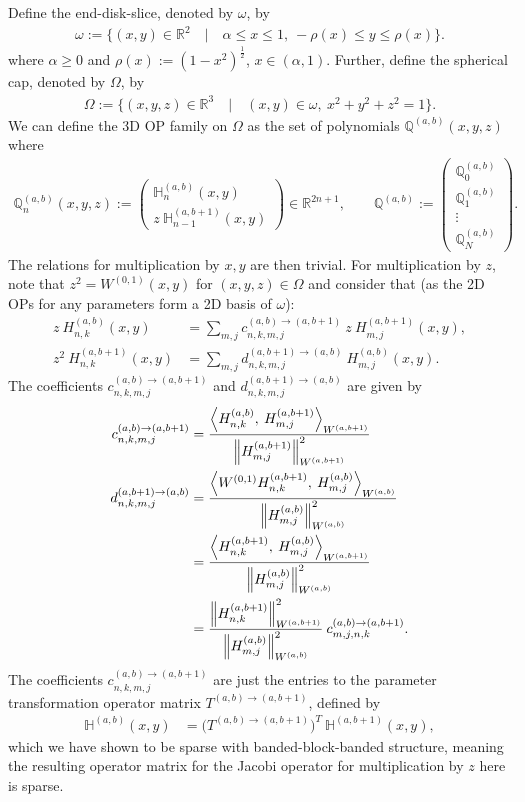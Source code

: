 \documentclass[11pt, oneside]{article}   	%
\newcommand{\half}{\frac{1}{2}}
\newcommand{\R}{\mathbb{R}}
\newcommand{\hdop}{H}
\newcommand{\bighdop}{\mathbb{\hdop}}
\newcommand{\hdopnk}{\hdop_{n,k}}
\newcommand{\hdopnkab}{\hdop_{n,k}^{(a,b)}}
\newcommand{\Wab}{{W^{(a,b)}}}
\newcommand{\hdopmjab}{\hdop_{m,j}^{(a,b)}}
\newcommand{\bighdopab}{\bighdop^{(a,b)}}
\newcommand{\bigQ}{\mathbb{Q}}
\newcommand{\bigQab}{\bigQ^{(a,b)}}
\begin{document}
Define the end-disk-slice, denoted by $\omega$, by
\begin{align}
	\omega := \{(x,y) \in \R^2 \quad | \quad \alpha \le x \le 1, \: - \rho(x) \le y \le \rho(x)\}.
\end{align}
where $\alpha \ge 0$ and $\rho(x) := (1-x^2)^{\half}$, $x \in (\alpha,1)$. Further, define the spherical cap, denoted by $\Omega$, by
\begin{align}
	\Omega := \{(x,y,z) \in \R^3 \quad | \quad (x,y) \in \omega, \: x^2 + y^2 + z^2 = 1\}.
\end{align}
We can define the 3D OP family on $\Omega$ as the set of polynomials $\bigQab(x,y,z)$ where
\begin{align}
	\bigQab_n(x,y,z) := \begin{pmatrix}
		\bighdopab_n(x,y) \\
		z \: \bighdop^{(a,b+1)}_{n-1}(x,y)
	\end{pmatrix} \in \R^{2n+1}, 
	\quad \quad 
	\bigQab := \begin{pmatrix}
		\bigQab_0 \\
		\bigQab_1 \\
		\vdots \\
		\bigQab_N
	\end{pmatrix}.
\end{align}
The relations for multiplication by $x, y$ are then trivial. For multiplication by $z$, note that $z^2 = W^{(0,1)}(x,y)$ for $(x,y,z) \in \Omega$ and consider that (as the 2D OPs for any parameters form a 2D basis of $\omega$):
\begin{align}
	z \: \hdopnkab(x,y) &= \sum_{m,j} c_{n,k,m,j}^{(a,b)\to(a,b+1)} \: z \: \hdop^{(a,b+1)}_{m,j}(x,y), \\
	z^2 \: \hdopnk^{(a,b+1)}(x,y) &= \sum_{m,j} d_{n,k,m,j}^{(a,b+1)\to(a,b)} \: \hdopmjab(x,y).
\end{align}
The coefficients $c_{n,k,m,j}^{(a,b)\to(a,b+1)}$ and $d_{n,k,m,j}^{(a,b+1)\to(a,b)}$ are given by
\begin{align}
	c_{n,k,m,j}^{(a,b)\to(a,b+1)} &= \frac{\ip< \hdopnkab, \: \hdop^{(a,b+1)}_{m,j} >_{W^{(a,b+1)}}}{\norm{\hdop^{(a,b+1)}_{m,j}}^2_{W^{(a,b+1)}}} \\
	d_{n,k,m,j}^{(a,b+1)\to(a,b)} &= \frac{\ip< W^{(0,1)} \hdopnk^{(a,b+1)}, \: \hdopmjab >_\Wab}{\norm{\hdopmjab}^2_\Wab} \nonumber \\
        	&= \frac{\ip< \hdopnk^{(a,b+1)}, \: \hdopmjab >_{W^{(a,b+1)}}}{\norm{\hdopmjab}^2_\Wab} \nonumber \\
        	&= \frac{\norm{\hdopnk^{(a,b+1)}}^2_{W^{(a,b+1)}}}{\norm{\hdopmjab}^2_\Wab} \: c_{m,j,n,k}^{(a,b)\to(a,b+1)}.
\end{align}
The coefficients $c_{n,k,m,j}^{(a,b)\to(a,b+1)}$ are just the entries to the parameter transformation operator matrix $T^{(a,b)\to(a,b+1)}$, defined by
\begin{align}
	\bighdop^{(a,b)}(x,y) &= \Big(T^{(a,b)\to(a,b+1)} \Big)^T \: \bighdop^{(a,b+1)}(x,y),
\end{align}
which we have shown to be sparse with banded-block-banded structure, meaning the resulting operator matrix for the Jacobi operator for multiplication by $z$ here is sparse.
\end{document}
